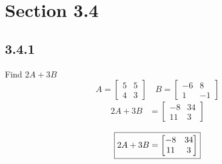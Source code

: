 \documentclass{article}
\begin{document}
\newcommand{\hr}{\par\noindent\rule{\textwidth}{0.4pt}}

\newcommand{\bc}[1]{
	\begin{equation*}
		\begin{boxed}
			{#1}
		\end{boxed}
	\end{equation*}
}

\newcommand{\cond}[2]{
	\ifmmode
		{#1} \quad {#2}
	\else
		$$ {#1} \quad {#2} $$
	\fi
}

\section{Section 3.4}

\subsection{3.4.1}
Find $ 2A + 3B $
$$
	A = \begin{bmatrix}
		5 & 5 \\
		4 & 3
	\end{bmatrix} \quad
	B = \begin{bmatrix}
		-6 & 8 \\
		1 & -1
	\end{bmatrix}
$$
\begin{align*}
	2A + 3B & = \begin{bmatrix}
		-8 & 34 \\
		11 & 3
	\end{bmatrix}
\end{align*}
\bc{
	2A + 3B = \begin{bmatrix}
		-8 & 34 \\
		11 & 3
	\end{bmatrix}
}
\end{document}
